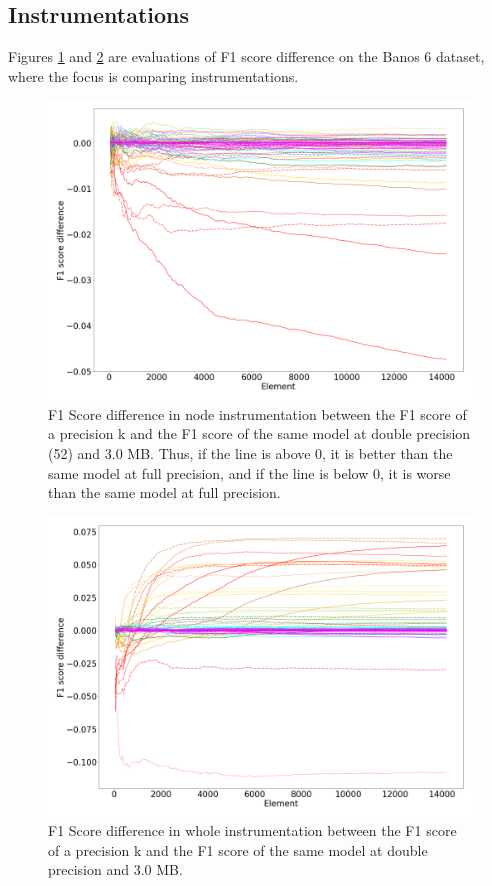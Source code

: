 \documentclass[conference]{IEEEtran}
\begin{document}
\subsection{Instrumentations}
Figures \ref{difnode} and \ref{difwhole} are evaluations of F1 score difference on the Banos 6 dataset, where the focus is comparing instrumentations. 
\begin{figure}[htbp]
\centerline{\includegraphics[width=\linewidth]{difnode11.png}}
\caption{F1 Score difference in node instrumentation between the F1 score of a precision k and the F1 score of the same model at double precision (52) and 3.0 MB. Thus, if the line is above 0, it is better than the same model at full precision, and if the line is below 0, it is worse than the same model at full precision.}
\label{difnode}
\end{figure}
\begin{figure}[htbp]
\centerline{\includegraphics[width=\linewidth]{difwhole11.png}}
\caption{F1 Score difference in whole instrumentation between the F1 score of a precision k and the F1 score of the same model at double precision and 3.0 MB.}
\label{difwhole}
\end{figure}
\end{document}
